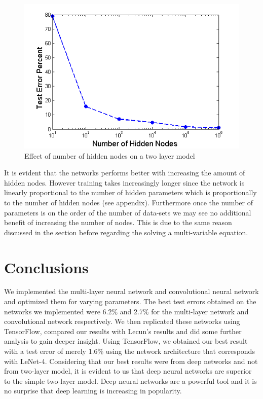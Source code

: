 \documentclass[12pt, twocolumn]{article}
\begin{document}
 \begin{figure}[H]
 	\includegraphics[scale=.5]{errorvshiddennodes.png}
 	\caption{Effect of number of hidden nodes on a two layer model}
 	\label{fig:trainsize}
 \end{figure}
It is evident that the networks performs better with increasing the amount of hidden nodes. However training takes increasingly longer since the network is linearly proportional to the number of hidden parameters which is proportionally to the number of hidden nodes (see appendix). Furthermore once the number of parameters is on the order of the number of data-sets we may see no additional benefit of increasing the number of nodes. This is due to the same reason discussed in the section before regarding the solving a multi-variable equation.

\section{Conclusions}
We implemented the multi-layer neural network and convolutional neural network and optimized them for varying parameters. The best test errors obtained on the networks we implemented were 6.2\% and 2.7\% for the multi-layer network and convolutional network respectively. We then replicated these networks using TensorFlow, compared our results with Lecun's results and did some further analysis to gain deeper insight.
 Using TensorFlow, we obtained our best result with a test error of merely 1.6\% using the network architecture that corresponds with LeNet-4. Considering that our best results were from deep networks and not from two-layer model, it is evident to us that deep neural networks are superior to the simple two-layer model. Deep neural networks are a powerful tool and it is no surprise that deep learning is increasing in popularity.
\end{document}
